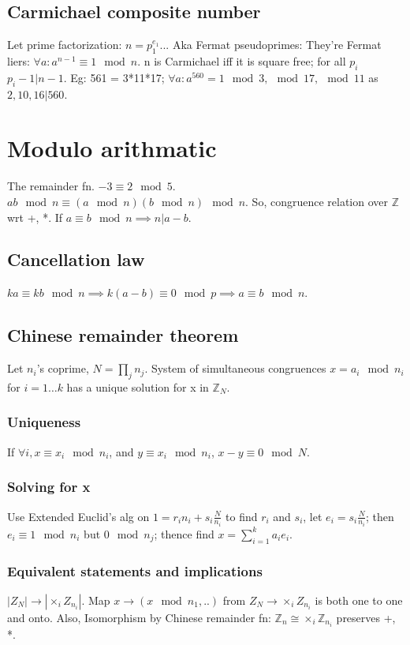 \documentclass[10pt]{amsart}
\begin{document}
\subsection{Carmichael composite number}
Let prime factorization: $n=p_{1}^{e_{1}} ..$. Aka Fermat pseudoprimes: They're Fermat liers: $\forall a: a^{n-1} \equiv 1 \mod n$. n is Carmichael iff it is square free; for all $p_{i}$ $p_{i}-1|n-1$. \why Eg: 561 = 3*11*17; $\forall a: a^{560} = 1 \mod 3, \mod 17, \mod 11$ as $2, 10, 16 | 560$.

\section{Modulo arithmatic}
The remainder fn. $-3 \equiv 2 \mod 5$. $ab \mod n \equiv (a \mod n) (b \mod n) \mod n$. So, congruence relation over $\mathbb{Z}$ wrt +, *. If $a \equiv b \mod n \implies n|a-b$.

\subsection{Cancellation law}
$ka \equiv kb \mod n \implies k(a-b) \equiv 0 \mod p \implies a \equiv b \mod n$.

\subsection{Chinese remainder theorem}
Let $n_{i}$'s coprime, $N=\prod_{j} n_{j}$. System of simultaneous congruences $x = a_{i} \mod n_{i}$ for $i=1 \dots k$ has a unique solution for x in $\mathbb{Z}_{N}$.

\subsubsection{Uniqueness}
If $\forall i, x \equiv x_{i} \mod n_{i}$, and $y \equiv x_{i} \mod n_{i}$, $x - y \equiv 0 \mod N$.

\subsubsection{Solving for x}
Use Extended Euclid's alg on $1=r_{i}n_{i}+s_{i}\frac{N}{n_{i}}$ to find $r_{i}$ and $s_{i}$, let $e_{i}=s_{i}\frac{N}{n_{i}}$; then $e_{i} \equiv 1 \mod n_{i}$ but $0 \mod n_{j}$; thence find $x=\sum_{i=1}^{k}a_{i}e_{i}$.

\subsubsection{Equivalent statements and implications}
$|Z_{N}| \to |\times_{i} Z_{n_{i}}|$. Map $x \to (x \mod n_{1}, ..)$ from $Z_{N} \to \times_{i} Z_{n_{i}}$ is both one to one and onto. Also, Isomorphism by Chinese remainder fn: $\mathbb{Z}_{n} \cong \times_{i}\mathbb{Z}_{n_{i}}$ preserves +, *.
\end{document}
